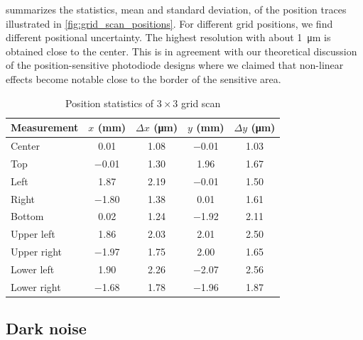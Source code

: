  summarizes the statistics, mean and standard deviation, of the position traces illustrated in \cref{fig:grid_scan_positions}.
For different grid positions, we find different positional uncertainty.
The highest resolution with about \SI{1}{\micro\meter} is obtained close to the center.
This is in agreement with our theoretical discussion of the position-sensitive photodiode designs where we claimed that non-linear effects become notable close to the border of the sensitive area.
\begin{table}[htb]
  \centering
  \begin{tabular}{lcccc}
    \toprule
      Measurement &
      $x$ (\si{\milli\meter}) &
      $\Delta x$ (\si{\micro\meter}) &
      $y$ (\si{\milli\meter}) &
      $\Delta y$ (\si{\micro\meter}) \\
    \midrule
      Center & \num{0.01} & \num{+1.08} & \num{-0.01} & \num{+1.03} \\      
      Top & \num{-0.01} & \num{+1.30} & \num{+1.96} & \num{+1.67} \\      
      Left & \num{1.87} & \num{+2.19} & \num{-0.01} & \num{+1.50} \\      
      Right & \num{-1.80} & \num{+1.38} & \num{+0.01} & \num{+1.61} \\
      Bottom & \num{0.02} & \num{+1.24} & \num{-1.92} & \num{+2.11} \\
      Upper left & \num{+1.86} & \num{+2.03} & \num{+2.01} & \num{+2.50} \\
      Upper right & \num{-1.97} & \num{+1.75} & \num{+2.00} & \num{+1.65} \\
      Lower left & \num{+1.90} & \num{+2.26} & \num{-2.07} & \num{+2.56} \\
      Lower right & \num{-1.68} & \num{+1.78} & \num{-1.96} & \num{+1.87} \\
    \bottomrule
  \end{tabular}
  \captionsetup{width=.8\textwidth}
  \caption{Position statistics of $3\times 3$ grid scan}\label{tab:grid_scan_position_statistics}
\end{table}

\subsection{Dark noise}

